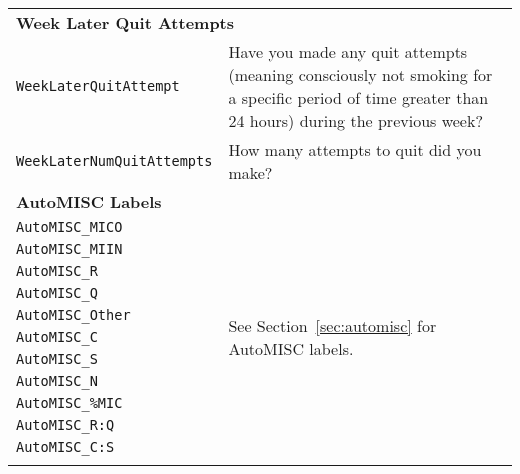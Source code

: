 \begin{longtable}{l p{10cm}}
\multicolumn{2}{l}{\textbf{Week Later Quit Attempts}} \\
\texttt{WeekLaterQuitAttempt} & Have you made any quit attempts (meaning consciously not smoking for a specific period of time greater than 24 hours) during the previous week?\\
\texttt{WeekLaterNumQuitAttempts} & How many attempts to quit did you make?\\
\midrule

\multicolumn{2}{l}{\textbf{AutoMISC Labels}} \\
\texttt{AutoMISC\_MICO} & \multirow{11}{*}{See Section~\ref{sec:automisc} for AutoMISC labels.}\\
\texttt{AutoMISC\_MIIN} &\\
\texttt{AutoMISC\_R} &\\
\texttt{AutoMISC\_Q} &\\
\texttt{AutoMISC\_Other} &\\
\texttt{AutoMISC\_C} &\\
\texttt{AutoMISC\_S} &\\
\texttt{AutoMISC\_N} &\\
\texttt{AutoMISC\_\%MIC} &\\
\texttt{AutoMISC\_R:Q} &\\
\texttt{AutoMISC\_C:S} &\\





\label{tab:datadesc}
\end{longtable}



\vspace{1em}


